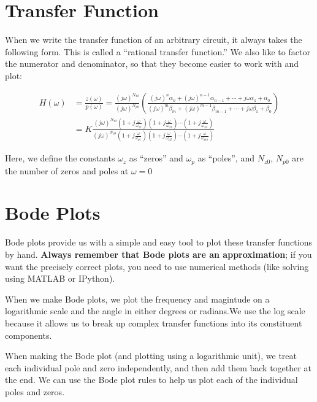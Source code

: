 
\section{Transfer Function}

When we write the transfer function of an arbitrary circuit, it always takes the following form. This is called a ``rational transfer function.'' We also like to factor the numerator and denominator, so that they become easier to work with and plot:

\begin{align*}
H(\omega) &= \frac{z(\omega)}{p(\omega)} =\frac{(j\omega)^{N_{z0}}}{(j\omega)^{N_{p0}}} \left( \frac{(j \omega)^n \alpha_n + (j\omega)^{n-1} \alpha_{n-1} + \cdots + j\omega \alpha_1 + \alpha_0}{(j \omega)^m \beta_m + (j\omega)^{m-1} \beta_{m-1} + \cdots + j\omega \beta_1 + \beta_0} \right) \\
&= K  \frac{(j\omega)^{N_{z0}} \left(1 + j\frac{\omega}{\omega_{z1}}\right)\left(1 + j\frac{\omega}{\omega_{z2}}\right) \cdots \left(1 + j\frac{\omega}{\omega_{zn}}\right)}{(j\omega)^{N_{p0}} \left(1 + j\frac{\omega}{\omega_{p1}}\right)\left(1 + j\frac{\omega}{\omega_{p2}}\right) \cdots \left(1 + j\frac{\omega}{\omega_{pm}}\right)}
\end{align*}

Here, we define the constants $\omega_{z}$ as ``zeros'' and $\omega_{p}$ as ``poles'', and $N_{z0}$, $N_{p0}$ are the number of zeros and poles at $\omega = 0$ 

\section{Bode Plots}
Bode plots provide us with a simple and easy tool to plot these transfer functions by hand. \textbf{Always remember that Bode plots are an approximation}; if you want the precisely correct plots, you need to use numerical methods (like solving using MATLAB or IPython).

When we make Bode plots, we plot the frequency and magintude on a logarithmic scale
and the angle in either degrees or radians.We use the log scale because it allows us to break up complex transfer functions into its constituent components. 

When making the Bode plot (and plotting using a logarithmic unit), we treat each individual pole and zero independently, and then add them back together at the end. We can use the Bode plot rules to help us plot each of the individual poles and zeros.

